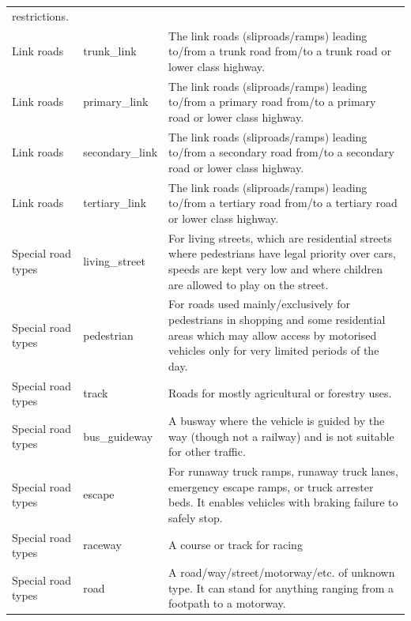 \documentclass[abstract=off,10pt,a4paper,bibliography=totocnumbered]{article}
\begin{document}
\begin{table}[hbtp]
\begin{center}
{\begin{tabular}{llp{12cm}}
          restrictions. \\
      \rowcolor[gray]{0.90}
      Link roads &
        trunk\_link &
          The link roads (sliproads/ramps) leading to/from a trunk road
          from/to a trunk road or lower class highway. \\
      \rowcolor[gray]{0.90}
      Link roads &
        primary\_link &
          The link roads (sliproads/ramps) leading to/from a primary road
          from/to a primary road or lower class highway. \\
      \rowcolor[gray]{0.90}
      Link roads &
        secondary\_link &
          The link roads (sliproads/ramps) leading to/from a secondary road
          from/to a secondary road or lower class highway. \\
      Link roads &
        tertiary\_link &
          The link roads (sliproads/ramps) leading to/from a tertiary road
          from/to a tertiary road or lower class highway. \\
      Special road types &
        living\_street &
          For living streets, which are residential streets where pedestrians
          have legal priority over cars, speeds are kept very low and where
          children are allowed to play on the street. \\
      Special road types &
        pedestrian &
          For roads used mainly/exclusively for pedestrians in shopping and
          some residential areas which may allow access by motorised vehicles
          only for very limited periods of the day. \\
      Special road types &
        track &
          Roads for mostly agricultural or forestry uses. \\
      Special road types &
        bus\_guideway &
          A busway where the vehicle is guided by the way (though not a railway)
          and is not suitable for other traffic. \\
      Special road types &
        escape &
          For runaway truck ramps, runaway truck lanes, emergency escape
          ramps, or truck arrester beds. It enables vehicles with braking
          failure to safely stop. \\
      Special road types &
        raceway &
          A course or track for racing \\
      Special road types &
        road &
          A road/way/street/motorway/etc. of unknown type. It can stand for
          anything ranging from a footpath to a motorway. \\
      \bottomrule
      \end{tabular}
    }
  \end{center}
\end{table}
\end{document}
